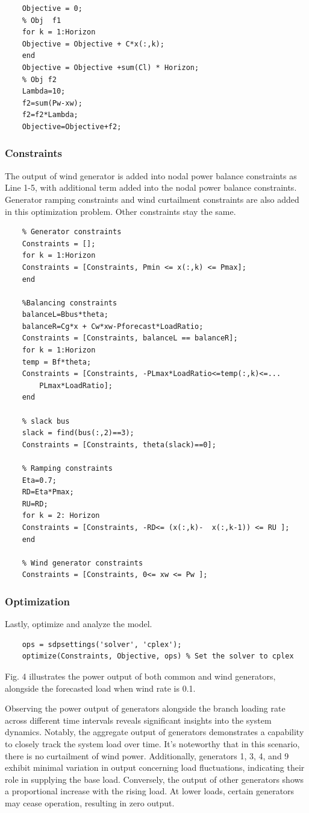 \documentclass[lettersize,journal]{IEEEtran}
\begin{document}
\begin{lstlisting}
	Objective = 0;
	% Obj  f1
	for k = 1:Horizon
	Objective = Objective + C*x(:,k);
	end
	Objective = Objective +sum(Cl) * Horizon;
	% Obj f2
	Lambda=10;
	f2=sum(Pw-xw);
	f2=f2*Lambda;
	Objective=Objective+f2;
\end{lstlisting}

\subsubsection{Constraints}
 The output of wind generator is added into nodal power balance constraints as Line 1-5, with additional term added into the nodal power balance constraints. Generator ramping constraints and wind curtailment constraints are also added in this optimization problem. Other constraints stay the same.
\begin{lstlisting}
	% Generator constraints
	Constraints = [];
	for k = 1:Horizon
	Constraints = [Constraints, Pmin <= x(:,k) <= Pmax];
	end
	
	%Balancing constraints
	balanceL=Bbus*theta;
	balanceR=Cg*x + Cw*xw-Pforecast*LoadRatio;
	Constraints = [Constraints, balanceL == balanceR];
	for k = 1:Horizon
	temp = Bf*theta;
	Constraints = [Constraints, -PLmax*LoadRatio<=temp(:,k)<=...
		PLmax*LoadRatio];
	end
	
	% slack bus
	slack = find(bus(:,2)==3);
	Constraints = [Constraints, theta(slack)==0];
	
	% Ramping constraints
	Eta=0.7;
	RD=Eta*Pmax;
	RU=RD;
	for k = 2: Horizon
	Constraints = [Constraints, -RD<= (x(:,k)-  x(:,k-1)) <= RU ];
	end
	
	% Wind generator constraints
	Constraints = [Constraints, 0<= xw <= Pw ];
\end{lstlisting}

\subsubsection{Optimization}
Lastly,  optimize and analyze the model.
\begin{lstlisting}
	ops = sdpsettings('solver', 'cplex');
	optimize(Constraints, Objective, ops) % Set the solver to cplex
\end{lstlisting}
Fig. 4 illustrates the power output of both common and wind generators, alongside the forecasted load when wind rate is 0.1.

Observing the power output of generators alongside the branch loading rate across different time intervals reveals significant insights into the system dynamics.  Notably, the aggregate output of generators demonstrates a capability to closely track the system load over time. It's noteworthy that in this scenario, there is no curtailment of wind power. Additionally, generators 1, 3, 4, and 9 exhibit minimal variation in output concerning load fluctuations, indicating their role in supplying the base load. Conversely, the output of other generators shows a proportional increase with the rising load. At lower loads, certain generators may cease operation, resulting in zero output.
\end{document}
